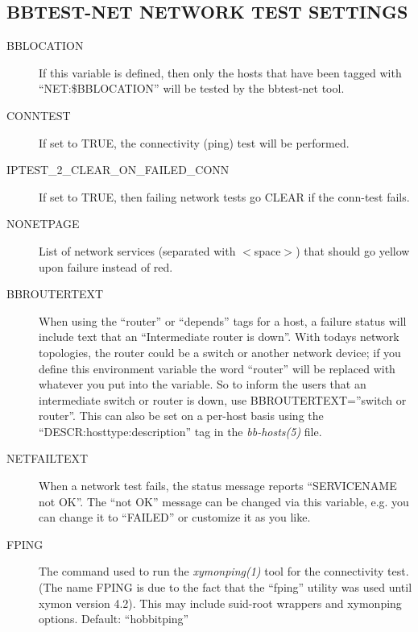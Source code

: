 \subsection{BBTEST-NET NETWORK TEST SETTINGS}


 \begin{description}
\item[BBLOCATION] If this variable is defined, then only the hosts that have been tagged with ``NET:\$BBLOCATION'' will be tested by the bbtest-net tool. 

 

\item[CONNTEST] If set to TRUE, the connectivity (ping) test will be performed. 

 

\item[IPTEST\_2\_CLEAR\_ON\_FAILED\_CONN] If set to TRUE, then failing network tests go CLEAR if the conn-test fails. 

 

\item[NONETPAGE] List of network services (separated with $<$space$>$) that should go yellow upon failure instead of red. 

 

\item[BBROUTERTEXT] When using the ``router'' or ``depends'' tags for a host, a failure status will include text that an ``Intermediate router is down''. With todays network topologies, the router could be a switch or another network device; if you define this environment variable the word ``router'' will be replaced with whatever you put into the variable. So to inform the users that an intermediate switch or router is down, use BBROUTERTEXT=''switch or router''. This can also be set on a per-host basis using the ``DESCR:hosttype:description'' tag in the \emph{bb-hosts(5)}
 file. 

 

\item[NETFAILTEXT] When a network test fails, the status message reports ``SERVICENAME not OK''. The ``not OK'' message can be changed via this variable, e.g. you can change it to ``FAILED'' or customize it as you like. 

 

\item[FPING] The command used to run the \emph{xymonping(1)}
 tool for the connectivity test. (The name FPING is due to the fact that the ``fping'' utility was used until xymon version 4.2). This may include suid-root wrappers and xymonping options. Default: ``hobbitping'' 


\end{description}
